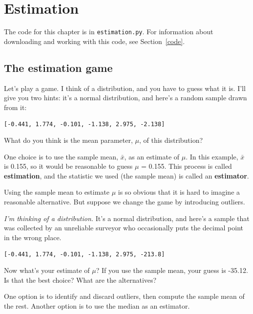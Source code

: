 \documentclass[12pt]{book}
\newcommand{\xbar}{\bar{x}}
\theoremstyle{exercise}
\begin{document}
\chapter{Estimation}%
\label{estimation}%

The code for this chapter is in {\tt estimation.py}.  For information
about downloading and working with this code, see Section~\ref{code}.


\section{The estimation game}

Let's play a game.  I think of a distribution, and you have to guess
what it is.  I'll give you two hints: it's a
normal distribution, and here's a random sample drawn from it:%
%
%
%

{\tt [-0.441, 1.774, -0.101, -1.138, 2.975, -2.138]}

What do you think is the mean parameter, $\mu$, of this distribution?%
%

One choice is to use the sample mean, $\xbar$, as an estimate of $\mu$.
In this example, $\xbar$ is 0.155, so it would
be reasonable to guess $\mu$ = 0.155.
This process is called {\bf estimation}, and the statistic we used
(the sample mean) is called an {\bf estimator}.%

Using the sample mean to estimate $\mu$ is so obvious that it is hard
to imagine a reasonable alternative.  But suppose we change the game by
introducing outliers.%
%
%
%

{\em I'm thinking of a distribution.\/}  It's a normal distribution, and
here's a sample that was collected by an unreliable surveyor who
occasionally puts the decimal point in the wrong place.%

{\tt [-0.441, 1.774, -0.101, -1.138, 2.975, -213.8]}

Now what's your estimate of $\mu$?  If you use the sample mean, your
guess is -35.12.  Is that the best choice?  What are the alternatives?%

One option is to identify and discard outliers, then compute the sample
mean of the rest.  Another option is to use the median as an estimator.%
\end{document}
